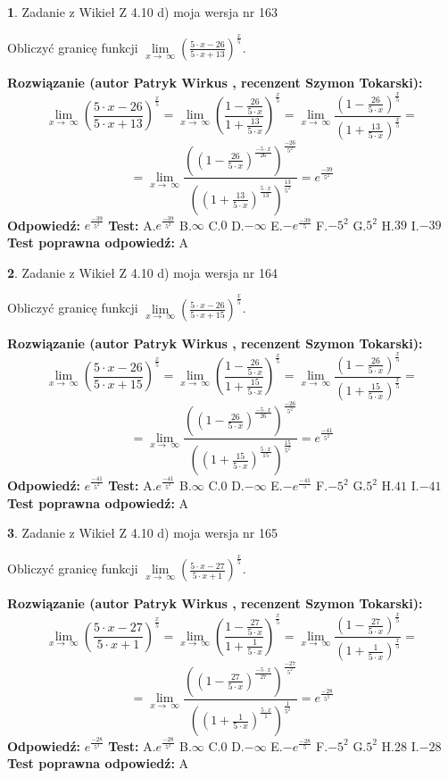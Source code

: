 \documentclass[12pt, a4paper]{article}
\theoremstyle{definition} %
\newtheorem{zad}{}
\newcommand{\zadStart}[1]{\begin{zad}#1\newline}
\newcommand{\zadStop}{\end{zad}}
\newcommand{\rozwStart}[2]{\noindent \textbf{Rozwiązanie (autor #1 , recenzent #2): }\newline}
\newcommand{\rozwStop}{\newline}
\newcommand{\odpStart}{\noindent \textbf{Odpowiedź:}\newline}
\newcommand{\odpStop}{\newline}
\newcommand{\testStart}{\noindent \textbf{Test:}\newline}
\newcommand{\testStop}{\newline}
\newcommand{\kluczStart}{\noindent \textbf{Test poprawna odpowiedź:}\newline}
\newcommand{\kluczStop}{\newline}
\begin{document}
\zadStart{Zadanie z Wikieł Z 4.10 d) moja wersja nr 163}


Obliczyć granicę funkcji  $\lim\limits_{x\to\ \infty}(\frac{5\cdot x-26}{5\cdot x+13})^{\frac{x}{5}}$.
\zadStop
\rozwStart{Patryk Wirkus}{Szymon Tokarski}
$$\lim\limits_{x\to\ \infty}(\frac{5\cdot x-26}{5\cdot x+13})^{\frac{x}{5}} = \lim\limits_{x\to\ \infty}(\frac{1-\frac{26}{5\cdot x}}{1+\frac{13}{5\cdot x}})^{\frac{x}{5}}=\lim\limits_{x\to\ \infty}\frac{(1-\frac{26}{5\cdot x})^{\frac{x}{5}}}{(1+\frac{13}{5\cdot x})^{\frac{x}{5}}}=$$
$$=\lim\limits_{x\to\ \infty}\frac{((1-\frac{26}{5\cdot x})^{\frac{-5\cdot x}{26}})^{\frac{-26}{5^{2}}}}{((1+\frac{13}{5\cdot x})^{\frac{5\cdot x}{13}})^{\frac{13}{5^{2}}}}=e^{\frac{-39}{5^{2}}}$$
\rozwStop
\odpStart
$e^{\frac{-39}{5^{2}}}$
\odpStop
\testStart
A.$e^{\frac{-39}{5^{2}}}$ B.$\infty$ C.$0$ D.$-\infty$ E.$-e^{\frac{-39}{5}}$
F.$-5^{2}$ G.$5^{2}$
H.$39$
I.$-39$
\testStop
\kluczStart
A
\kluczStop



\zadStart{Zadanie z Wikieł Z 4.10 d) moja wersja nr 164}


Obliczyć granicę funkcji  $\lim\limits_{x\to\ \infty}(\frac{5\cdot x-26}{5\cdot x+15})^{\frac{x}{5}}$.
\zadStop
\rozwStart{Patryk Wirkus}{Szymon Tokarski}
$$\lim\limits_{x\to\ \infty}(\frac{5\cdot x-26}{5\cdot x+15})^{\frac{x}{5}} = \lim\limits_{x\to\ \infty}(\frac{1-\frac{26}{5\cdot x}}{1+\frac{15}{5\cdot x}})^{\frac{x}{5}}=\lim\limits_{x\to\ \infty}\frac{(1-\frac{26}{5\cdot x})^{\frac{x}{5}}}{(1+\frac{15}{5\cdot x})^{\frac{x}{5}}}=$$
$$=\lim\limits_{x\to\ \infty}\frac{((1-\frac{26}{5\cdot x})^{\frac{-5\cdot x}{26}})^{\frac{-26}{5^{2}}}}{((1+\frac{15}{5\cdot x})^{\frac{5\cdot x}{15}})^{\frac{15}{5^{2}}}}=e^{\frac{-41}{5^{2}}}$$
\rozwStop
\odpStart
$e^{\frac{-41}{5^{2}}}$
\odpStop
\testStart
A.$e^{\frac{-41}{5^{2}}}$ B.$\infty$ C.$0$ D.$-\infty$ E.$-e^{\frac{-41}{5}}$
F.$-5^{2}$ G.$5^{2}$
H.$41$
I.$-41$
\testStop
\kluczStart
A
\kluczStop



\zadStart{Zadanie z Wikieł Z 4.10 d) moja wersja nr 165}


Obliczyć granicę funkcji  $\lim\limits_{x\to\ \infty}(\frac{5\cdot x-27}{5\cdot x+1})^{\frac{x}{5}}$.
\zadStop
\rozwStart{Patryk Wirkus}{Szymon Tokarski}
$$\lim\limits_{x\to\ \infty}(\frac{5\cdot x-27}{5\cdot x+1})^{\frac{x}{5}} = \lim\limits_{x\to\ \infty}(\frac{1-\frac{27}{5\cdot x}}{1+\frac{1}{5\cdot x}})^{\frac{x}{5}}=\lim\limits_{x\to\ \infty}\frac{(1-\frac{27}{5\cdot x})^{\frac{x}{5}}}{(1+\frac{1}{5\cdot x})^{\frac{x}{5}}}=$$
$$=\lim\limits_{x\to\ \infty}\frac{((1-\frac{27}{5\cdot x})^{\frac{-5\cdot x}{27}})^{\frac{-27}{5^{2}}}}{((1+\frac{1}{5\cdot x})^{\frac{5\cdot x}{1}})^{\frac{1}{5^{2}}}}=e^{\frac{-28}{5^{2}}}$$
\rozwStop
\odpStart
$e^{\frac{-28}{5^{2}}}$
\odpStop
\testStart
A.$e^{\frac{-28}{5^{2}}}$ B.$\infty$ C.$0$ D.$-\infty$ E.$-e^{\frac{-28}{5}}$
F.$-5^{2}$ G.$5^{2}$
H.$28$
I.$-28$
\testStop
\kluczStart
A
\kluczStop
\end{document}
